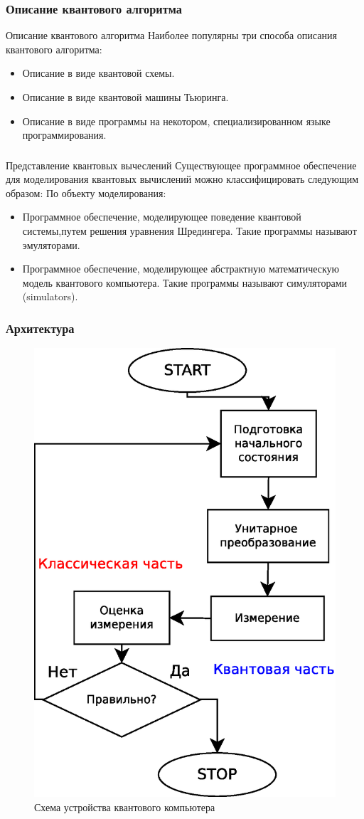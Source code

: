 \documentclass{beamer}
\begin{document}
\begin{frame}
\frametitle{Описание квантового алгоритма}
\begin{block}{Описание квантового алгоритма}
Наиболее популярны три способа описания квантового алгоритма:
\begin{itemize}
  \item Описание в виде квантовой схемы.
  \item Описание в виде квантовой машины Тьюринга.
  \item Описание в виде программы на некотором, специализированном языке программирования.
\end{itemize}
\end{block}
\end{frame}
\begin{frame}
 \frametitle{}
 \begin{block}{Представление квантовых вычеслений}
 Существующее программное обеспечение для моделирования квантовых вычислений можно классифицировать следующим
образом:
По объекту моделирования:
\begin{itemize}
  \item Программное обеспечение, моделирующее поведение квантовой системы,путем решения уравнения Шредингера. Такие программы называют эмуляторами.
  \item Программное обеспечение, моделирующее абстрактную математическую модель квантового компьютера. Такие программы называют симуляторами (simulators).
\end{itemize}
\end{block}
\end{frame}
\begin{frame}
 \frametitle{Архитектура}
\begin{figure}[h]
\includegraphics[width=0.42\linewidth]{images/kk1.eps}
\caption{Схема устройства квантового компьютера}
\end{figure} 
\end{frame}
\end{document}
